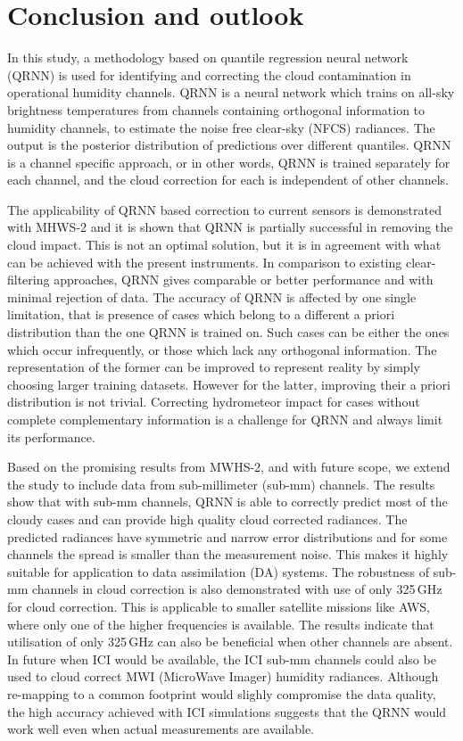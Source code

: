 \documentclass[amt, manuscript]{copernicus}
\begin{document}
\section{Conclusion and outlook}  %
\label{conclusions}
%

In this study, a methodology based on quantile regression neural network (QRNN) is used for identifying and correcting the cloud contamination in operational humidity channels. QRNN is a neural network which trains on all-sky brightness temperatures from  channels containing orthogonal information to humidity channels, to estimate the noise free clear-sky (NFCS) radiances. The output is the posterior distribution of predictions over different quantiles. QRNN is a channel specific approach, or in other words, QRNN is trained separately for each channel, and the cloud correction for each is independent of other channels. 
 
The applicability of QRNN based correction to current sensors is demonstrated with MHWS-2 and it is shown that QRNN is partially successful in removing the cloud impact. This is not  an optimal solution, but it is in agreement with what can be achieved with the present instruments. In comparison to existing clear-filtering approaches, QRNN gives comparable or better performance and with minimal rejection of data. The accuracy of QRNN is affected by one single limitation, that is presence of cases which belong to a different a priori distribution than the one QRNN is trained on. Such cases can be either the ones which occur infrequently, or those which lack any orthogonal information. The representation of the former can be improved to represent reality by simply choosing larger training datasets. However for the latter, improving their a priori distribution is not trivial. Correcting hydrometeor impact for cases without complete complementary information is a challenge for QRNN and always limit its performance.

Based on the promising results from MWHS-2, and with future scope, we extend the study to include data from sub-millimeter (sub-mm) channels. The results show that with  sub-mm channels, QRNN is able to correctly predict most of the cloudy cases and can provide high quality cloud corrected radiances. The predicted radiances have symmetric and narrow error distributions and for some channels the spread is smaller than the measurement noise. This makes it highly suitable for application to data assimilation (DA) systems. The robustness of sub-mm channels in cloud correction is also demonstrated with use of only 325\,GHz for cloud correction. This is applicable to smaller satellite missions like AWS, where only one of the higher frequencies is available. The results indicate that utilisation of only 325\,GHz can also be beneficial when other channels are absent. In future when ICI would be available, the ICI sub-mm channels could also be used to cloud correct MWI (MicroWave Imager) humidity radiances. Although re-mapping to a common footprint would slighly compromise the data quality, the high accuracy achieved with ICI simulations suggests that the QRNN would work well even when actual measurements are available.
\end{document}
